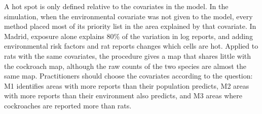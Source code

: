  A hot spot is only defined relative to the covariates in the model. In the simulation, when the environmental covariate was not given to the model, every method placed most of its priority list in the area explained by that covariate. In Madrid, exposure alone explains 80\% of the variation in log reports, and adding environmental risk factors and rat reports changes which cells are hot. Applied to rats with the same covariates, the procedure gives a map that shares little with the cockroach map, although the raw counts of the two species are almost the same map. Practitioners should choose the covariates according to the question: M1 identifies areas with more reports than their population predicts, M2 areas with more reports than their environment also predicts, and M3 areas where cockroaches are reported more than rats.


